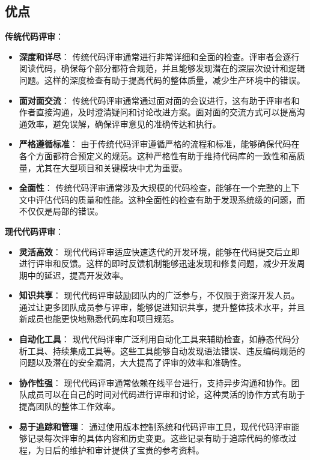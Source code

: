 \documentclass{article}
\begin{document}
\subsection{优点}

\textbf{传统代码评审}：

\begin{itemize}
    \item \textbf{深度和详尽}：
    传统代码评审通常进行非常详细和全面的检查。评审者会逐行阅读代码，确保每个部分都符合规范，并且能够发现潜在的深层次设计和逻辑问题。这样的深度检查有助于提高代码的整体质量，减少生产环境中的错误。

    \item \textbf{面对面交流}：
    传统代码评审通常通过面对面的会议进行，这有助于评审者和作者直接沟通，及时澄清疑问和讨论改进方案。面对面的交流方式可以提高沟通效率，避免误解，确保评审意见的准确传达和执行。

    \item \textbf{严格遵循标准}：
    由于传统代码评审遵循严格的流程和标准，能够确保代码在各个方面都符合预定义的规范。这种严格性有助于维持代码库的一致性和高质量，尤其在大型项目和关键模块中尤为重要。

    \item \textbf{全面性}：
    传统代码评审通常涉及大规模的代码检查，能够在一个完整的上下文中评估代码的质量和性能。这种全面性的检查有助于发现系统级的问题，而不仅仅是局部的错误。
\end{itemize}

\textbf{现代代码评审}：

\begin{itemize}
    \item \textbf{灵活高效}：
    现代代码评审适应快速迭代的开发环境，能够在代码提交后立即进行评审和反馈。这样的即时反馈机制能够迅速发现和修复问题，减少开发周期中的延迟，提高开发效率。

    \item \textbf{知识共享}：
    现代代码评审鼓励团队内的广泛参与，不仅限于资深开发人员。通过让更多团队成员参与评审，能够促进知识共享，提升整体技术水平，并且新成员也能更快地熟悉代码库和项目规范。

    \item \textbf{自动化工具}：
    现代代码评审广泛利用自动化工具来辅助检查，如静态代码分析工具、持续集成工具等。这些工具能够自动发现语法错误、违反编码规范的问题以及潜在的安全漏洞，大大提高了评审的效率和准确性。

    \item \textbf{协作性强}：
    现代代码评审通常依赖在线平台进行，支持异步沟通和协作。团队成员可以在自己的时间对代码进行评审和讨论，这种灵活的协作方式有助于提高团队的整体工作效率。

    \item \textbf{易于追踪和管理}：
    通过使用版本控制系统和代码评审工具，现代代码评审能够记录每次评审的具体内容和历史变更。这些记录有助于追踪代码的修改过程，为日后的维护和审计提供了宝贵的参考资料。
\end{itemize}
\end{document}
